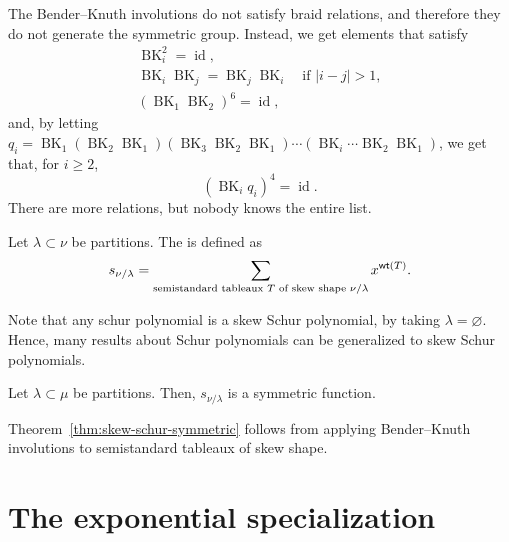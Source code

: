 \begin{remark}
    The Bender--Knuth involutions do not satisfy braid relations,
    and therefore they do not generate the symmetric group.
    Instead, we get elements that satisfy
    \begin{gather}
        \operatorname{BK}_i^2 = \operatorname{id}, \\
        \operatorname{BK}_i \operatorname{BK}_j = \operatorname{BK}_j \operatorname{BK}_i \quad \text{if } |i - j| > 1, \\
        (\operatorname{BK}_1 \operatorname{BK}_2)^6 = \operatorname{id},
    \end{gather}
    and, by letting \(q_i =
    \operatorname{BK}_1
    (\operatorname{BK}_2 \operatorname{BK}_1)
    (\operatorname{BK}_3 \operatorname{BK}_2 \operatorname{BK}_1)
    \cdots
    (\operatorname{BK}_i \cdots \operatorname{BK}_2 \operatorname{BK}_1)\),
    we get that, for \(i \geq 2\),
    \begin{equation}
        (\operatorname{BK}_i q_i)^4 = \operatorname{id}.
    \end{equation}
    There are more relations, but nobody knows the entire list.
\end{remark}

\begin{definition} \label{def:skew-schur}
    Let \(\lambda \subset \nu\) be partitions.
    The  is defined as
    \begin{equation}
        s_{\nu / \lambda} = \sum_{\text{semistandard tableaux } T \text{ of skew shape } \nu / \lambda} x^{\operatorname{\mathsf{wt}}(T)}.
    \end{equation}
\end{definition}

Note that any schur polynomial is a skew Schur polynomial, by taking \(\lambda = \varnothing\).
Hence, many results about Schur polynomials can be generalized to skew Schur polynomials.

\begin{theorem} \label{thm:skew-schur-symmetric}
    Let \(\lambda \subset \mu\) be partitions.
    Then, \(s_{\nu / \lambda}\) is a symmetric function.
\end{theorem}

Theorem~\ref{thm:skew-schur-symmetric} follows from applying Bender--Knuth involutions to semistandard tableaux of skew shape.

\section{The exponential specialization}

